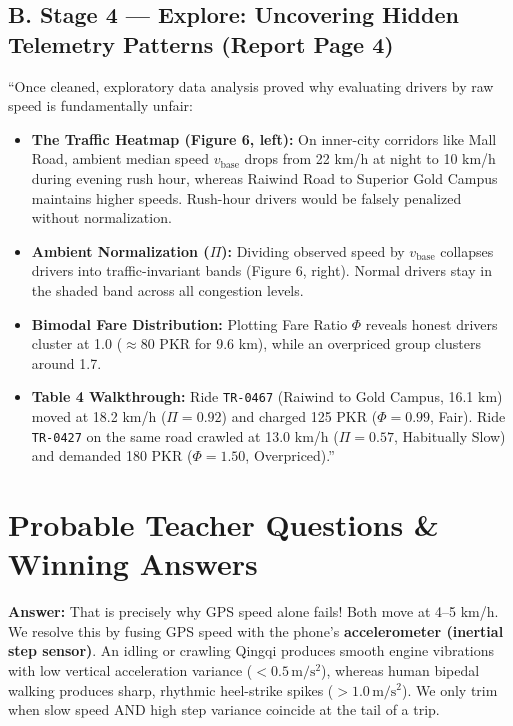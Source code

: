 \documentclass[10pt, a4paper]{article}
\begin{document}
\subsection{B. Stage 4 --- Explore: Uncovering Hidden Telemetry Patterns (Report Page 4)}
\begin{speaking}
\footnotesize
``Once cleaned, exploratory data analysis proved why evaluating drivers by raw speed is fundamentally unfair:
\begin{itemize}\setlength{\itemsep}{0.8pt}\setlength{\parskip}{0pt}
  \item \textbf{The Traffic Heatmap (Figure 6, left):} On inner-city corridors like Mall Road, ambient median speed \(v_{\mathrm{base}}\) drops from 22 km/h at night to 10 km/h during evening rush hour, whereas Raiwind Road to Superior Gold Campus maintains higher speeds. Rush-hour drivers would be falsely penalized without normalization.
  \item \textbf{Ambient Normalization (\(\Pi\)):} Dividing observed speed by \(v_{\mathrm{base}}\) collapses drivers into traffic-invariant bands (Figure 6, right). Normal drivers stay in the shaded band across all congestion levels.
  \item \textbf{Bimodal Fare Distribution:} Plotting Fare Ratio \(\Phi\) reveals honest drivers cluster at 1.0 (\(\approx 80\) PKR for 9.6 km), while an overpriced group clusters around 1.7.
  \item \textbf{Table 4 Walkthrough:} Ride \texttt{TR-0467} (Raiwind to Gold Campus, 16.1 km) moved at 18.2 km/h (\(\Pi = 0.92\)) and charged 125 PKR (\(\Phi = 0.99\), Fair). Ride \texttt{TR-0427} on the same road crawled at 13.0 km/h (\(\Pi = 0.57\), Habitually Slow) and demanded 180 PKR (\(\Phi = 1.50\), Overpriced).''
\end{itemize}
\end{speaking}

\newpage

\section{Probable Teacher Questions \& Winning Answers}

\begin{qa}
\footnotesize
\textbf{Answer:} That is precisely why GPS speed alone fails! Both move at 4--5 km/h. We resolve this by fusing GPS speed with the phone's \textbf{accelerometer (inertial step sensor)}. An idling or crawling Qingqi produces smooth engine vibrations with low vertical acceleration variance (\(< 0.5\,\mathrm{m/s^2}\)), whereas human bipedal walking produces sharp, rhythmic heel-strike spikes (\(> 1.0\,\mathrm{m/s^2}\)). We only trim when slow speed AND high step variance coincide at the tail of a trip.
\end{qa}
\end{document}

